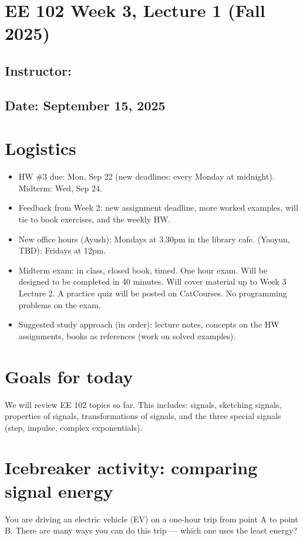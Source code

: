 \documentclass{ee102_notes}
\renewcommand{\releasedate}{September 15, 2025}
\begin{document}
\section*{EE 102 Week 3, Lecture 1 (Fall 2025)}
\subsection*{Instructor: \instructor}
\subsection*{Date: \releasedate}

\section*{Logistics}
\begin{itemize}
  \item HW \#3 due: Mon, Sep 22 (new deadlines: every Monday at midnight). \quad Midterm: Wed, Sep 24.
  \item Feedback from Week 2: new assignment deadline, more worked examples, will tie to book exercises, and the weekly HW. 
  \item New office hours (Ayush): Mondays at 3.30pm in the library cafe. (Yaoyun, TBD): Fridays at 12pm. 
  \item Midterm exam: in class, closed book, timed. One hour exam. Will be designed to be completed in 40 minutes. Will cover material up to Week 3 Lecture 2. A practice quiz will be posted on CatCourses. No programming problems on the exam.
  \item Suggested study approach (in order): lecture notes, concepts on the HW assignments, books as references (work on solved examples). 
\end{itemize}

\section{Goals for today}
We will review EE 102 topics so far. This includes: signals, sketching signals, properties of signals, transformations of signals, and the three special signals (step, impulse, complex exponentials).

\section{Icebreaker activity: comparing signal energy}
You are driving an electric vehicle (EV) on a one-hour trip from point A to point B. There are many ways you can do this trip --- which one uses the least energy?
\medskip
\end{document}
